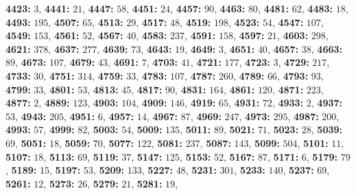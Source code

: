 \textsf{\bfseries 4423:} $3$, \textsf{\bfseries 4441:} $21$, \textsf{\bfseries 4447:} $58$, \textsf{\bfseries 4451:} $24$, \textsf{\bfseries 4457:} $90$, \textsf{\bfseries 4463:} $80$, \textsf{\bfseries 4481:} $62$, \textsf{\bfseries 4483:} $18$, \textsf{\bfseries 4493:} $195$, \textsf{\bfseries 4507:} $65$, \textsf{\bfseries 4513:} $29$, \textsf{\bfseries 4517:} $48$, \textsf{\bfseries 4519:} $198$, \textsf{\bfseries 4523:} $54$, \textsf{\bfseries 4547:} $107$, \textsf{\bfseries 4549:} $153$, \textsf{\bfseries 4561:} $52$, \textsf{\bfseries 4567:} $40$, \textsf{\bfseries 4583:} $237$, \textsf{\bfseries 4591:} $158$, \textsf{\bfseries 4597:} $21$, \textsf{\bfseries 4603:} $298$, \textsf{\bfseries 4621:} $378$, \textsf{\bfseries 4637:} $277$, \textsf{\bfseries 4639:} $73$, \textsf{\bfseries 4643:} $19$, \textsf{\bfseries 4649:} $3$, \textsf{\bfseries 4651:} $40$, \textsf{\bfseries 4657:} $38$, \textsf{\bfseries 4663:} $89$, \textsf{\bfseries 4673:} $107$, \textsf{\bfseries 4679:} $43$, \textsf{\bfseries 4691:} $7$, \textsf{\bfseries 4703:} $41$, \textsf{\bfseries 4721:} $177$, \textsf{\bfseries 4723:} $3$, \textsf{\bfseries 4729:} $217$, \textsf{\bfseries 4733:} $30$, \textsf{\bfseries 4751:} $314$, \textsf{\bfseries 4759:} $33$, \textsf{\bfseries 4783:} $107$, \textsf{\bfseries 4787:} $260$, \textsf{\bfseries 4789:} $66$, \textsf{\bfseries 4793:} $93$, \textsf{\bfseries 4799:} $33$, \textsf{\bfseries 4801:} $53$, \textsf{\bfseries 4813:} $45$, \textsf{\bfseries 4817:} $90$, \textsf{\bfseries 4831:} $164$, \textsf{\bfseries 4861:} $120$, \textsf{\bfseries 4871:} $223$, \textsf{\bfseries 4877:} $2$, \textsf{\bfseries 4889:} $123$, \textsf{\bfseries 4903:} $104$, \textsf{\bfseries 4909:} $146$, \textsf{\bfseries 4919:} $65$, \textsf{\bfseries 4931:} $72$, \textsf{\bfseries 4933:} $2$, \textsf{\bfseries 4937:} $53$, \textsf{\bfseries 4943:} $205$, \textsf{\bfseries 4951:} $6$, \textsf{\bfseries 4957:} $14$, \textsf{\bfseries 4967:} $87$, \textsf{\bfseries 4969:} $247$, \textsf{\bfseries 4973:} $295$, \textsf{\bfseries 4987:} $200$, \textsf{\bfseries 4993:} $57$, \textsf{\bfseries 4999:} $82$, \textsf{\bfseries 5003:} $54$, \textsf{\bfseries 5009:} $135$, \textsf{\bfseries 5011:} $89$, \textsf{\bfseries 5021:} $71$, \textsf{\bfseries 5023:} $28$, \textsf{\bfseries 5039:} $69$, \textsf{\bfseries 5051:} $18$, \textsf{\bfseries 5059:} $70$, \textsf{\bfseries 5077:} $122$, \textsf{\bfseries 5081:} $237$, \textsf{\bfseries 5087:} $143$, \textsf{\bfseries 5099:} $504$, \textsf{\bfseries 5101:} $11$, \textsf{\bfseries 5107:} $18$, \textsf{\bfseries 5113:} $69$, \textsf{\bfseries 5119:} $37$, \textsf{\bfseries 5147:} $125$, \textsf{\bfseries 5153:} $52$, \textsf{\bfseries 5167:} $87$, \textsf{\bfseries 5171:} $6$, \textsf{\bfseries 5179:} $79$, \textsf{\bfseries 5189:} $15$, \textsf{\bfseries 5197:} $53$, \textsf{\bfseries 5209:} $133$, \textsf{\bfseries 5227:} $48$, \textsf{\bfseries 5231:} $301$, \textsf{\bfseries 5233:} $140$, \textsf{\bfseries 5237:} $69$, \textsf{\bfseries 5261:} $12$, \textsf{\bfseries 5273:} $26$, \textsf{\bfseries 5279:} $21$, \textsf{\bfseries 5281:} $19$, 
